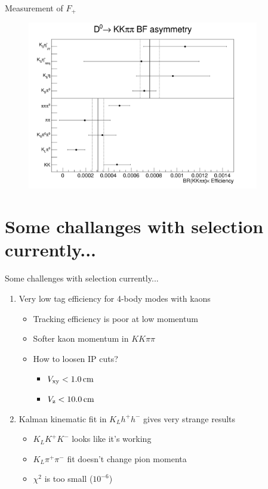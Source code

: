 \documentclass{beamer}
\begin{document}
\begin{frame}{Measurement of $F_+$}
  \begin{figure}
    \centering
    \includegraphics[width=0.9\textwidth]{Plots/CPeven_fraction_combination.png}
  \end{figure}
\end{frame}

\section{Some challanges with selection currently...}
\begin{frame}{Some challenges with selection currently...}
  \begin{enumerate}
    \setlength\itemsep{1.5em}
    \item{Very low tag efficiency for 4-body modes with kaons}
    \begin{itemize}
      \setlength\itemsep{1.0em}
      \item{Tracking efficiency is poor at low momentum}
      \item{Softer kaon momentum in $KK\pi\pi$}
      \item{How to loosen IP cuts?}
      \begin{itemize}
        \item{$V_{\rm xy} < \SI{1.0}{\centi\meter}$}
        \item{$V_{\rm z} < \SI{10.0}{\centi\meter}$}
      \end{itemize}
    \end{itemize}
    \item{Kalman kinematic fit in $K_Lh^+h^-$ gives very strange results}
    \begin{itemize}
      \setlength\itemsep{1.0em}
      \item{$K_LK^+K^-$ looks like it's working}
      \item{$K_L\pi^+\pi^-$ fit doesn't change pion momenta}
      \item{$\chi^2$ is too small ($10^{-6}$)}
    \end{itemize}
  \end{enumerate}
\end{frame}
\end{document}
